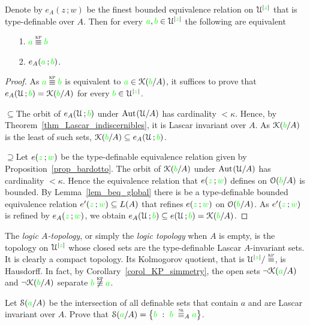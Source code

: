 \documentclass[creche.tex]{subfiles}
\begin{document}
\begin{theorem}\label{thm_Krupinski}
Denote by $e_A(z\,;w)$ be the finest bounded equivalence relation on $\EuScript U^{|{\color{green} z}|}$ that is type-definable over $A$. Then for every ${\color{green} a}, {\color{green} b}\in\EuScript U^{|{\color{green} z}|}$ the following are equivalent
 \begin{itemize}
\item[1.] ${\gr a}\equivKP{\gr b}$
\item[2.] $e_A({\color{green} a}\,;{\color{green} b})$.\QED
\end{itemize} 
\end{theorem}
\begin{proof} 
  As  ${\gr a}\equivKP{\gr b}$ is equivalent to ${\color{green} a}\in\EuScript K({\color{green} b}/A)$, it suffices to prove that $e_A(\EuScript U\,;{\color{green} b})=\EuScript K({\color{green} b}/A)$ for every ${\color{green} b}\in\EuScript U^{|{\color{green} z}|}$. 
 
  $\subseteq$\quad The orbit of $e_A(\EuScript U\,;{\color{green} b})$ under $\textrm{Aut\kern.15ex}(\EuScript U/A)$ has cardinality $<\kappa$. Hence, by Theorem~\ref{thm_Lascar_indiscernibles}, it is  Lascar invariant over $A$. As $\EuScript K({\color{green} b}/A)$ is the least of such sets, $\EuScript K({\color{green} b}/A)\subseteq e_A(\EuScript U\,;{\color{green} b})$.
  
  $\supseteq$\quad Let $e({\color{green} z}\,;{\color{green} w})$ be the type-definable equivalence relation given by Proposition~\ref{prop_bardotto}. The orbit of $\EuScript K({\color{green} b}/A)$ under $\textrm{Aut\kern.15ex}(\EuScript U/A)$ has cardinality $<\kappa$. Hence the equivalence relation that $e({\color{green} z}\,;{\color{green} w})$ defines on $\EuScript O({\color{green} b}/A)$ is bounded. By Lemma~\ref{lem_beq_global} there is  be a type-definable bounded equivalence relation $e'({\color{green} z}\,;{\color{green} w})\subseteq L(A)$ that refines $e({\color{green} z}\,;{\color{green} w})$ on $\EuScript O({\color{green} b}/A)$. As $e'({\color{green} z}\,;{\color{green} w})$ is refined by $e_A({\color{green} z}\,;{\color{green} w})$, we obtain $e_A(\EuScript U\,;{\color{green} b})\subseteq e(\EuScript U\,;{\color{green} b})=\EuScript K({\color{green} b}/A)$.
\end{proof}


The \emph{logic $A$-topology}, or simply the  \emph{logic topology} when $A$ is empty, is the topology on $\EuScript U^{|{\color{green} z}|}$ whose closed sets are the type-definable Lascar $A$-invariant sets. It is clearly a compact topology. Its Kolmogorov quotient, that is $\U^{|{\gr z}|}/\equivKP$, is Hausdorff. In fact, by Corollary~\ref{corol_KP_simmetry}, the open sets $\neg\EuScript K({\color{green} a}/A)$ and $\neg\EuScript K({\color{green} b}/A)$ separate ${\gr b}\not\equivKP{\gr a}$.

\begin{exercise}
Let $\EuScript S({\color{green} a}/A)$ be the intersection of all definable sets that contain $a$ and are Lascar invariant over $A$. Prove that $\S({\gr a}/A)=\big\{{\gr b}\ :\ {\gr b}\;\equivSh_A {\gr a}\big\}$.\QED
\end{exercise}
\end{document}
